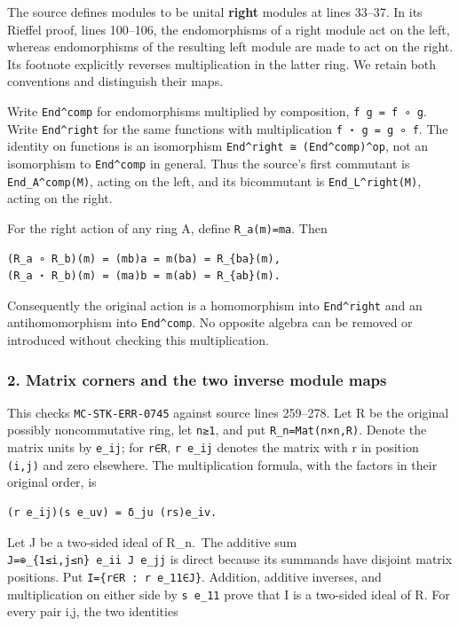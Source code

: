 \documentclass[11pt]{article}
\begin{document}
The source defines modules to be unital \textbf{right} modules at lines 33--37. In its Rieffel proof, lines 100--106, the endomorphisms of a right module act on the left, whereas endomorphisms of the resulting left module are made to act on the right. Its footnote explicitly reverses multiplication in the latter ring. We retain both conventions and distinguish their maps.

Write \texttt{End\^{}comp} for endomorphisms multiplied by composition, \texttt{f\ g\ =\ f\ ∘\ g}. Write \texttt{End\^{}right} for the same functions with multiplication \texttt{f\ ⋆\ g\ =\ g\ ∘\ f}. The identity on functions is an isomorphism \texttt{End\^{}right\ ≅\ (End\^{}comp)\^{}op}, not an isomorphism to \texttt{End\^{}comp} in general. Thus the source's first commutant is \texttt{End\_A\^{}comp(M)}, acting on the left, and its bicommutant is \texttt{End\_L\^{}right(M)}, acting on the right.

For the right action of any ring A, define \texttt{R\_a(m)=ma}. Then

\begin{verbatim}
(R_a ∘ R_b)(m) = (mb)a = m(ba) = R_{ba}(m),
(R_a ⋆ R_b)(m) = (ma)b = m(ab) = R_{ab}(m).
\end{verbatim}

Consequently the original action is a homomorphism into \texttt{End\^{}right} and an antihomomorphism into \texttt{End\^{}comp}. No opposite algebra can be removed or introduced without checking this multiplication.

\subsubsection{2. Matrix corners and the two inverse module maps}\label{matrix-corners-and-the-two-inverse-module-maps}

This checks \texttt{MC-STK-ERR-0745} against source lines 259--278. Let R be the original possibly noncommutative ring, let \texttt{n≥1}, and put \texttt{R\_n=Mat(n×n,R)}. Denote the matrix units by \texttt{e\_ij}; for \texttt{r∈R}, \texttt{r\ e\_ij} denotes the matrix with r in position \texttt{(i,j)} and zero elsewhere. The multiplication formula, with the factors in their original order, is

\begin{verbatim}
(r e_ij)(s e_uv) = δ_ju (rs)e_iv.
\end{verbatim}

Let J be a two-sided ideal of R\_n.~The additive sum \texttt{J=⊕\_\{1≤i,j≤n\}\ e\_ii\ J\ e\_jj} is direct because its summands have disjoint matrix positions. Put \texttt{I=\{r∈R\ :\ r\ e\_11∈J\}}. Addition, additive inverses, and multiplication on either side by \texttt{s\ e\_11} prove that I is a two-sided ideal of R. For every pair i,j, the two identities
\end{document}

